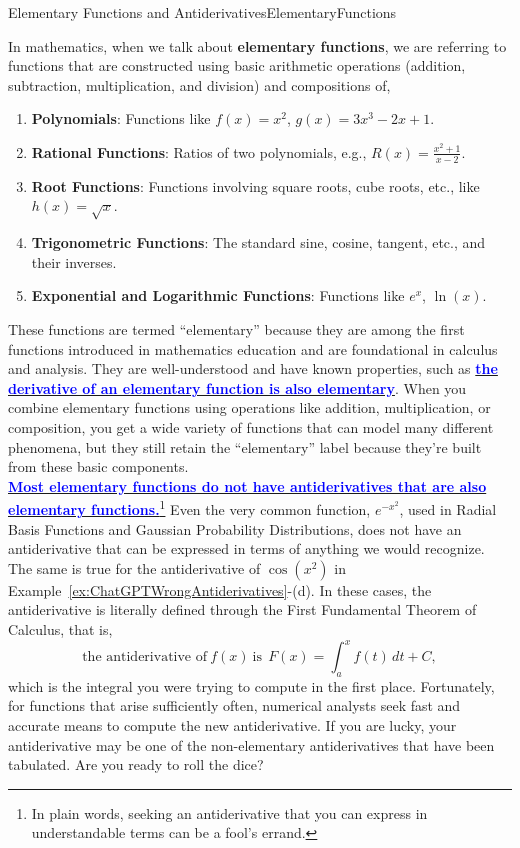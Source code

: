 \begin{funColor}{Elementary Functions and Antiderivatives}{ElementaryFunctions}

In mathematics, when we talk about \textbf{elementary functions}, we are referring to functions that are constructed using basic arithmetic operations (addition, subtraction, multiplication, and division) and compositions of,
\begin{enumerate}
    \item \textbf{Polynomials}: Functions like \( f(x) = x^2 \), \( g(x) = 3x^3 - 2x + 1 \).
    \item \textbf{Rational Functions}: Ratios of two polynomials, e.g., \( R(x) = \frac{x^2 + 1}{x - 2} \).
    \item \textbf{Root Functions}: Functions involving square roots, cube roots, etc., like \( h(x) = \sqrt{x} \).
    \item \textbf{Trigonometric Functions}: The standard sine, cosine, tangent, etc., and their inverses.
    \item \textbf{Exponential and Logarithmic Functions}: Functions like \( e^x \), \( \ln(x) \).
\end{enumerate}

These functions are termed ``elementary'' because they are among the first functions introduced in mathematics education and are foundational in calculus and analysis. They are well-understood and have known properties, such as \href{https://en.wikipedia.org/wiki/Elementary_function#:~:text=elliptic%20integral.-,Closure,-%5Bedit%5D}{\textcolor{blue}{\bf the derivative of an elementary function is also elementary}}. When you combine elementary functions using operations like addition, multiplication, or composition, you get a wide variety of functions that can model many different phenomena, but they still retain the ``elementary'' label because they're built from these basic components.\\


\href{https://math.stackexchange.com/questions/265780/how-to-determine-with-certainty-that-a-function-has-no-elementary-antiderivative}{\textcolor{blue}{\textbf{Most elementary functions do not have antiderivatives that are also elementary functions.}}}\footnote{In plain words, seeking an antiderivative that you can express in understandable terms can be a fool's errand.} Even the very common function, \( e^{-x^2} \), used in Radial Basis Functions and Gaussian Probability Distributions, does not have an antiderivative that can be expressed in terms of anything we would recognize. The same is true for the antiderivative of \( \cos(x^2) \) in Example~\ref{ex:ChatGPTWrongAntiderivatives}-(d). In these cases, the antiderivative is literally defined through the First Fundamental Theorem of Calculus, that is, 
$$
\text{the antiderivative of}~f(x)~\text{is}~~ F(x) = \int_a^x f(t) \, dt + C,
$$
which is the integral you were trying to compute in the first place. Fortunately, for functions that arise sufficiently often, numerical analysts seek fast and accurate means to compute the new antiderivative. If you are lucky, your antiderivative may be one of the non-elementary antiderivatives that have been tabulated. Are you ready to roll the dice?\\



\end{funColor}

